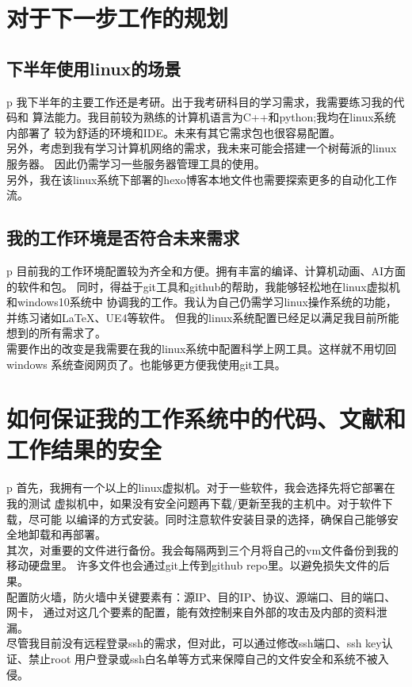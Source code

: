 \documentclass{ctexart}
\begin{document}
    \section{对于下一步工作的规划}\label{S3}
    \subsection{下半年使用linux的场景}\label{S3.1}
    \begin{tabular}{p\columnwidth}
        我下半年的主要工作还是考研。出于我考研科目的学习需求，我需要练习我的代码和
        算法能力。我目前较为熟练的计算机语言为C++和python;我均在linux系统内部署了
        较为舒适的环境和IDE。未来有其它需求包也很容易配置。\\
        另外，考虑到我有学习计算机网络的需求，我未来可能会搭建一个树莓派的linux服务器。
        因此仍需学习一些服务器管理工具的使用。\cite{RaspberryPie}\\
        另外，我在该linux系统下部署的hexo博客本地文件也需要探索更多的自动化工作流。
    \end{tabular}
    \subsection{我的工作环境是否符合未来需求}\label{S3.2}
    \begin{tabular}{p\columnwidth}
        目前我的工作环境配置较为齐全和方便。拥有丰富的编译、计算机动画、AI方面的软件和包。
        同时，得益于git工具和github的帮助，我能够轻松地在linux虚拟机和windows10系统中
        协调我的工作。我认为自己仍需学习linux操作系统的功能，并练习诸如LaTeX、UE4等软件。
        但我的linux系统配置已经足以满足我目前所能想到的所有需求了。\\
        需要作出的改变是我需要在我的linux系统中配置科学上网工具。这样就不用切回windows
        系统查阅网页了。也能够更方便我使用git工具。
    \end{tabular}
    \section{如何保证我的工作系统中的代码、文献和工作结果的安全}\label{S4}
    \begin{tabular}{p\columnwidth}
        首先，我拥有一个以上的linux虚拟机。对于一些软件，我会选择先将它部署在我的测试
        虚拟机中，如果没有安全问题再下载/更新至我的主机中。对于软件下载，尽可能
        以编译的方式安装。同时注意软件安装目录的选择，确保自己能够安全地卸载和再部署。\\
        其次，对重要的文件进行备份。我会每隔两到三个月将自己的vm文件备份到我的移动硬盘里。
        许多文件也会通过git上传到github repo里。以避免损失文件的后果。\\
        配置防火墙，防火墙中关键要素有：源IP、目的IP、协议、源端口、目的端口、网卡，
        通过对这几个要素的配置，能有效控制来自外部的攻击及内部的资料泄漏。\\
        尽管我目前没有远程登录ssh的需求，但对此，可以通过修改ssh端口、ssh key认证、禁止root
        用户登录或ssh白名单等方式来保障自己的文件安全和系统不被入侵。\cite{OnlineSafe}
    \end{tabular}
    
\end{document}
